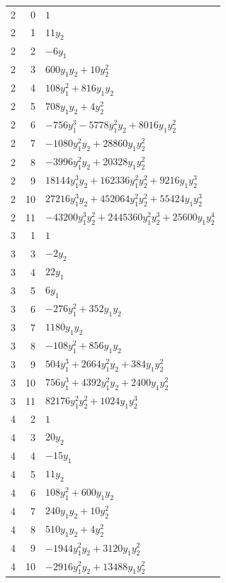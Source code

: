 \documentclass[10pt,a4paper]{article}
\begin{document}
{\begin{longtable}{rrp{125mm}}
2 & 0 & $1$\\
2 & 1 & $11 y_{2}$\\
2 & 2 & $- 6 y_{1}$\\
2 & 3 & $600 y_{1} y_{2} + 10 y_{2}^{2}$\\
2 & 4 & $108 y_{1}^{2} + 816 y_{1} y_{2}$\\
2 & 5 & $708 y_{1} y_{2} + 4 y_{2}^{2}$\\
2 & 6 & $- 756 y_{1}^{3} - 5778 y_{1}^{2} y_{2} + 8016 y_{1} y_{2}^{2}$\\
2 & 7 & $- 1080 y_{1}^{2} y_{2} + 28860 y_{1} y_{2}^{2}$\\
2 & 8 & $- 3996 y_{1}^{2} y_{2} + 20328 y_{1} y_{2}^{2}$\\
2 & 9 & $18144 y_{1}^{3} y_{2} + 162336 y_{1}^{2} y_{2}^{2} + 9216 y_{1} y_{2}^{3}$\\
2 & 10 & $27216 y_{1}^{3} y_{2} + 452064 y_{1}^{2} y_{2}^{2} + 55424 y_{1} y_{2}^{3}$\\
2 & 11 & $- 43200 y_{1}^{3} y_{2}^{2} + 2445360 y_{1}^{2} y_{2}^{3} + 25600 y_{1} y_{2}^{4}$\\
3 & 1 & $1$\\
3 & 3 & $- 2 y_{2}$\\
3 & 4 & $22 y_{1}$\\
3 & 5 & $6 y_{1}$\\
3 & 6 & $- 276 y_{1}^{2} + 352 y_{1} y_{2}$\\
3 & 7 & $1180 y_{1} y_{2}$\\
3 & 8 & $- 108 y_{1}^{2} + 856 y_{1} y_{2}$\\
3 & 9 & $504 y_{1}^{3} + 2664 y_{1}^{2} y_{2} + 384 y_{1} y_{2}^{2}$\\
3 & 10 & $756 y_{1}^{3} + 4392 y_{1}^{2} y_{2} + 2400 y_{1} y_{2}^{2}$\\
3 & 11 & $82176 y_{1}^{2} y_{2}^{2} + 1024 y_{1} y_{2}^{3}$\\
4 & 2 & $1$\\
4 & 3 & $20 y_{2}$\\
4 & 4 & $- 15 y_{1}$\\
4 & 5 & $11 y_{2}$\\
4 & 6 & $108 y_{1}^{2} + 600 y_{1} y_{2}$\\
4 & 7 & $240 y_{1} y_{2} + 10 y_{2}^{2}$\\
4 & 8 & $510 y_{1} y_{2} + 4 y_{2}^{2}$\\
4 & 9 & $- 1944 y_{1}^{2} y_{2} + 3120 y_{1} y_{2}^{2}$\\
4 & 10 & $- 2916 y_{1}^{2} y_{2} + 13488 y_{1} y_{2}^{2}$\\

\end{longtable}}
\end{document}
